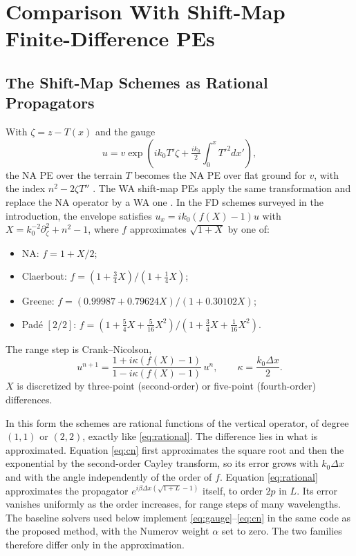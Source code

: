 \documentclass[journal]{IEEEtran}
\newcommand{\pd}{\partial}
\begin{document}
\section{Comparison With Shift-Map Finite-Difference PEs}\label{sec:shiftmap}

\subsection{The Shift-Map Schemes as Rational Propagators}
With $\zeta=z-T(x)$ and the gauge
\begin{equation}\label{eq:gauge}
u=v\exp\left(ik_0T'\zeta+\tfrac{ik_0}{2}\textstyle\int_0^xT'^2dx'\right),
\end{equation}
the NA PE over the terrain $T$ becomes the NA PE over flat ground for $v$, with
the index $n^2-2\zeta T''$ \cite{beilis1979coupled,barrios1994tpem}. The WA
shift-map PEs apply the same transformation and replace the NA operator by a WA
one \cite{donohue2000gtpe,holm2007wasm}. In the FD schemes surveyed in the
introduction, the envelope satisfies $u_x=ik_0(f(X)-1)u$ with
$X=k_0^{-2}\pd^2_\zeta+n^2-1$, where $f$ approximates $\sqrt{1+X}$ by one of:
\begin{itemize}
\item NA: $f=1+X/2$;
\item Claerbout: $f=(1+\frac34X)/(1+\frac14X)$;
\item Greene: $f=(0.99987+0.79624X)/(1+0.30102X)$;
\item Pad\'e $[2/2]$: $f=(1+\frac54X+\frac5{16}X^2)/(1+\frac34X+\frac1{16}X^2)$.
\end{itemize}
The range step is Crank--Nicolson,
\begin{equation}\label{eq:cn}
u^{n+1}=\frac{1+i\kappa(f(X)-1)}{1-i\kappa(f(X)-1)}\,u^n,\qquad\kappa=\frac{k_0\Delta x}{2}.
\end{equation}
$X$ is discretized by three-point (second-order) or five-point (fourth-order)
differences.

In this form the schemes are rational functions of the vertical operator, of
degree $(1,1)$ or $(2,2)$, exactly like \eqref{eq:rational}. The difference lies
in what is approximated. Equation \eqref{eq:cn} first approximates the square
root and then the exponential by the second-order Cayley transform, so its
error grows with $k_0\Delta x$ and with the angle independently of the order of
$f$. Equation \eqref{eq:rational} approximates the propagator
$e^{i\beta\Delta x(\sqrt{1+L}-1)}$ itself, to order $2p$ in $L$. Its error
vanishes uniformly as the order increases, for range steps of many wavelengths.
The baseline solvers used below implement \eqref{eq:gauge}--\eqref{eq:cn} in the
same code as the proposed method, with the Numerov weight $\alpha$ set to zero.
The two families therefore differ only in the approximation.
\end{document}
